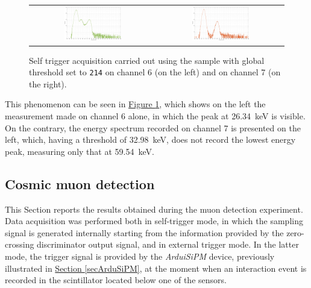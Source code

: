 \begin{figure}[h!]
    \centering
    \begin{tabular}{cc}
        \includegraphics[width=0.47\textwidth]{Images/chap3/results/americio/ch4_americio_log_ch6.pdf} & \includegraphics[width=0.47\textwidth]{Images/chap3/results/americio/ch4_americio_log_ch7.pdf}\\
    \end{tabular}
    \caption{Self trigger acquisition carried out using the  sample with global threshold set to \texttt{214} on channel 6 (on the left) and on channel 7 (on the right).}
    \label{figAmericioCH6-7}
\end{figure}

\par
This phenomenon can be seen in \hyperref[figAmericioCH6-7]{Figure \ref{figAmericioCH6-7}}, which shows on the left the measurement made on channel 6 alone, in which the peak at \SI{26.34}{\kilo\electronvolt} is visible. On the contrary, the energy spectrum recorded on channel 7 is presented on the left, which, having a threshold of \SI{32.98}{\kilo\electronvolt}, does not record the lowest energy peak, measuring only that at \SI{59.54}{\kilo\electronvolt}.

\subsection{Cosmic muon detection}
\label{secMuonDetectionResults}

This Section reports the results obtained during the muon detection experiment. Data acquisition was performed both in self-trigger mode, in which the sampling signal is generated internally starting from the information provided by the zero-crossing discriminator output signal, and in external trigger mode. In the latter mode, the trigger signal is provided by the \textit{ArduiSiPM} device, previously illustrated in \hyperref[secArduSiPM]{Section \ref{secArduSiPM}}, at the moment when an interaction event is recorded in the scintillator located below one of the sensors.

